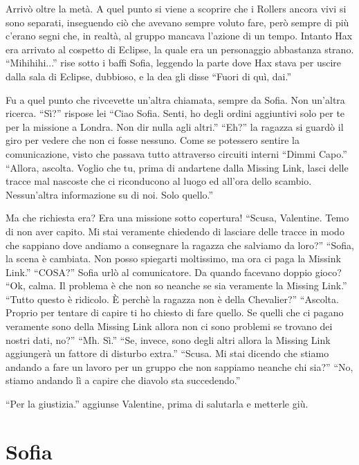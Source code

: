     Arrivò oltre la metà. A quel punto si viene a scoprire che i Rollers ancora vivi si sono separati, inseguendo ciò
    che avevano sempre voluto fare, però sempre di più c'erano segni che, in realtà, al gruppo mancava l'azione di un
    tempo. Intanto Hax era arrivato al cospetto di Eclipse, la quale era un personaggio abbastanza strano.
    ``Mihihihi...'' rise sotto i baffi Sofia, leggendo la parte dove Hax stava per uscire dalla sala di Eclipse,
    dubbioso, e la dea gli disse ``Fuori di quì, dai.''

    Fu a quel punto che rivcevette un'altra chiamata, sempre da Sofia. Non un'altra ricerca. ``Sì?'' rispose lei ``Ciao
    Sofia. Senti, ho degli ordini aggiuntivi solo per te per la missione a Londra. Non dir nulla agli altri.'' ``Eh?''
    la ragazza si guardò il giro per vedere che non ci fosse nessuno. Come se potessero sentire la comunicazione, visto
    che passava tutto attraverso circuiti interni ``Dimmi Capo.'' ``Allora, ascolta. Voglio che tu, prima di andartene
    dalla Missing Link, lasci delle tracce mal nascoste che ci riconducono al luogo ed all'ora dello scambio.
    Nessun'altra informazione su di noi. Solo quello.''

    Ma che richiesta era? Era una missione sotto copertura! ``Scusa, Valentine. Temo di non aver capito. Mi stai
    veramente chiedendo di lasciare delle tracce in modo che sappiano dove andiamo a consegnare la ragazza che salviamo
    da loro?'' ``Sofia, la scena è cambiata. Non posso spiegarti moltissimo, ma ora ci paga la Missink Link.'' ``COSA?''
    Sofia urlò al comunicatore. Da quando facevano doppio gioco? ``Ok, calma. Il problema è che non so neanche se sia
    veramente la Missing Link.'' ``Tutto questo è ridicolo. È perchè la ragazza non è della Chevalier?'' ``Ascolta.
    Proprio per tentare di capire ti ho chiesto di fare quello. Se quelli che ci pagano veramente sono della Missing
    Link allora non ci sono problemi se trovano dei nostri dati, no?'' ``Mh. Sì.'' ``Se, invece, sono degli altri allora
    la Missing Link aggiungerà un fattore di disturbo extra.'' ``Scusa. Mi stai dicendo che stiamo andando a fare un
    lavoro per un gruppo che non sappiamo neanche chi sia?'' ``No, stiamo andando lì a capire che diavolo sta
    succedendo.''

    ``Per la giustizia.'' aggiunse Valentine, prima di salutarla e metterle giù.

  \section*{Sofia}

